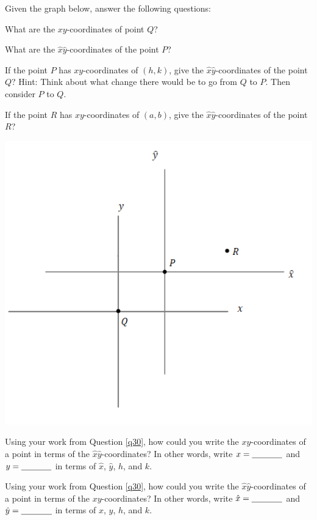 \bq \label{q30}
Given the graph below, answer the following questions:
\be
\item What are the $xy$-coordinates of point $Q$?
\item What are the $\hat{x} \hat{y}$-coordinates of the point $P$?
\item If the point $P$ has $xy$-coordinates of $(h,k)$, give the $\hat{x} \hat{y}$-coordinates of the point $Q$? Hint: Think about what change there would be to go from $Q$ to $P$. Then consider $P$ to $Q$.
\item If the point $R$ has $xy$-coordinates of $(a,b)$, give the $\hat{x} \hat{y}$-coordinates of the point $R$?
\ee

\begin{center} \includegraphics[scale=.75]{2dcoordchange.png} \end{center}
\eq

\bq \label{q31}  \be
\item Using your work from Question \ref{q30}, how could you write the $xy$-coordinates of a point in terms of the $\hat{x} \hat{y}$-coordinates? In other words, write $x=\underline{\hspace{.5in}}$ and $y=\underline{\hspace{.5in}}$ in terms of $\hat{x}$, $\hat{y}$, $h$, and $k$.
\item Using your work from Question \ref{q30}, how could you write the $\hat{x} \hat{y}$-\break coordinates of a point in terms of the $xy$-coordinates? In other words, write $\hat{x}=\underline{\hspace{.5in}}$ and $\hat{y}=\underline{\hspace{.5in}}$ in terms of $x$, $y$, $h$, and $k$.
\ee
\eq


